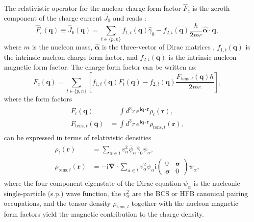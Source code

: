 \documentclass[aps,prc,twocolumn,floatfix,nofootinbib,preprintnumbers,superscriptaddress,longbibliography]{revtex4-1}
\renewcommand{\vec}{\boldsymbol}
\begin{document}
The relativistic operator for the nuclear charge form factor $\hat{F}_c$ is
 the zeroth component of the charge current $\hat{J}_0$
and reads \cite{Friar1975}:
\begin{equation}
  \hat{F}_c(\vec{q})
  \equiv
  \hat{J}_0(\vec{q})
  =
  \sum_{t\in\{p,n\}}
  f_{1,t}(\vec{q})\hat{\gamma}_0
  -
  f_{2,t}(\vec{q})\frac{\hbar}{2mc}\hat{\vec{\alpha}}\!\cdot\!\vec{q},
\end{equation}
where $m$ is the nucleon mass, $\hat{\vec{\alpha}}$ is the three-vector of Dirac matrices
\cite{Bjo64aB}, $f_{1,t}(\vec{q})$ is the intrinsic nucleon charge form factor,
and $f_{2,t}(\vec{q})$ is the intrinsic nucleon magnetic form factor. The charge
form factor can be written as:
\begin{equation}
  F_c(\vec{q})
  =
  \sum_{t\in\{p,n\}}\left[
  f_{1,t}(\vec{q})F_t(\vec{q})
    -
  f_{2,t}(\vec{q})\frac{F_{\mathrm{tens},t}(\vec{q})\hbar}{2mc}\right],
\end{equation}
where the form factors
\begin{align}
\begin{aligned}
  F_t(\vec{q})
  &=
  \int d^3r\,e^{\mathbf{i}\vec{q}\cdot\vec{r}}\rho_t(\vec{r}),
\\
  F_{\mathrm{tens},t}(\vec{q})
  &=
  \int d^3r\,e^{\mathbf{i}\vec{q}\cdot\vec{r}}\rho_{\mathrm{tens},t}(\vec{r}),
  \end{aligned}
 \end{align} 
can be expressed in terms of relativistic densities
\begin{align}
\begin{aligned}
  \rho_t(\vec{r})
  &=
  \sum_{\alpha\in t}v_\alpha^2\overline{\psi}_\alpha\hat{\gamma}_0\psi_\alpha^{\mbox{}},
\\
  \rho_{\mathrm{tens},t}(\vec{r})
  &=
  -\mathrm{i}\vec{\nabla}\cdot
  \sum_{\alpha\in t}v_\alpha^2\overline{\psi}_\alpha
  \mathrm{i}\left(\begin{array}{cc}
    0 & \vec{\sigma} \\ \vec{\sigma} & 0
  \end{array}\right)
  \psi_\alpha^{\mbox{}},
\end{aligned}
\end{align}
where the four-component eigenstate of the Dirac equation $\psi_\alpha$ is the nucleonic single-particle (s.p.)
wave function, the $v_\alpha^2$ are the BCS or HFB canonical pairing occupations, and the  tensor  density $  \rho_{\mathrm{tens},t}$ together with the nucleon magnetic form factors yield the magnetic  contribution to the charge density.
\end{document}
